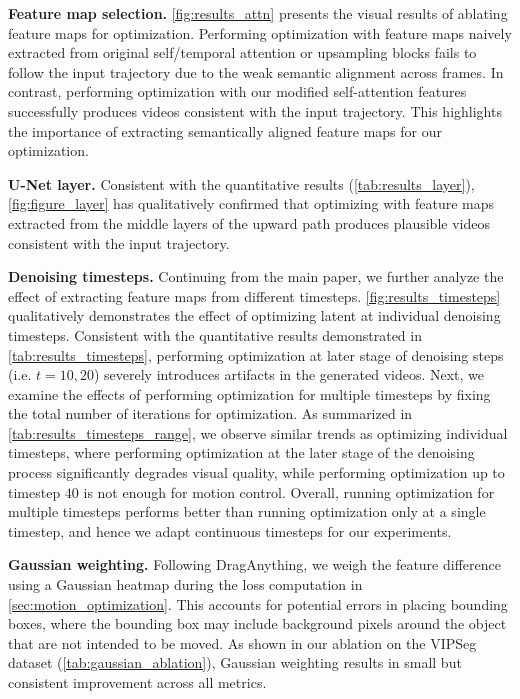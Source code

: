 \textbf{Feature map selection.} \cref{fig:results_attn} presents the visual results of ablating feature maps for optimization. 
Performing optimization with feature maps naively extracted from original self/temporal attention or upsampling blocks fails to follow the input trajectory due to the weak semantic alignment across frames. 
In contrast, performing optimization with our modified self-attention features successfully produces videos consistent with the input trajectory.
This highlights the importance of extracting semantically aligned feature maps for our optimization. 

\textbf{U-Net layer.} 
Consistent with the quantitative results 
(\cref{tab:results_layer}), \cref{fig:figure_layer} has qualitatively confirmed that optimizing with feature maps extracted from the middle layers of the upward path produces plausible videos consistent with the input trajectory.

\textbf{Denoising timesteps.} 
Continuing from the main paper, we further analyze the effect of extracting feature maps from different timesteps.
\cref{fig:results_timesteps} qualitatively demonstrates the effect of optimizing latent at individual denoising timesteps.  
Consistent with the quantitative results demonstrated in \cref{tab:results_timesteps}, performing optimization at later stage of denoising steps (i.e. $t=10, 20$) severely introduces artifacts in the generated videos.
Next, we examine the effects of performing optimization for multiple timesteps by fixing the total number of iterations for optimization.
As summarized in \cref{tab:results_timesteps_range}, we observe similar trends as optimizing individual timesteps, where performing optimization at the later stage of the denoising process significantly degrades visual quality, while performing optimization up to timestep $40$ is not enough for motion control. 
Overall, running optimization for multiple timesteps performs better than running optimization only at a single timestep, and hence we adapt continuous timesteps for our experiments. 

\textbf{Gaussian weighting.} Following DragAnything, we weigh the feature difference using a Gaussian heatmap during the loss computation in \cref{sec:motion_optimization}. This accounts for potential errors in placing bounding boxes, where the bounding box may include background pixels around the object that are not intended to be moved. As shown in our ablation on the VIPSeg dataset (\cref{tab:gaussian_ablation}), Gaussian weighting results in small but consistent improvement across all metrics.

